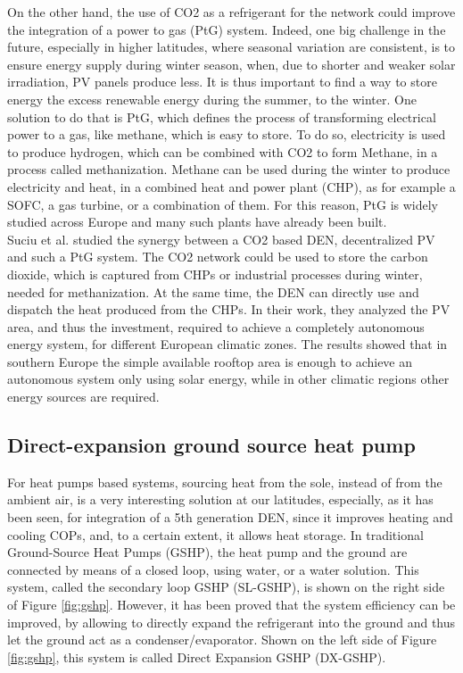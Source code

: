 \documentclass{article}
\begin{document}
On the other hand, the use of CO2 as a refrigerant for the network could improve the integration of a power to gas (PtG) system. Indeed, one big challenge in the future, especially in higher latitudes, where seasonal variation are consistent, is to ensure energy supply during winter season, when, due to shorter and weaker solar irradiation, PV panels produce less. It is thus important to find a way to store energy the excess renewable energy during the summer, to the winter.
One solution to do that is PtG, which defines the process of transforming electrical power to a gas, like methane, which is easy to store. To do so, electricity is used to produce hydrogen, which can be combined with CO2 to form Methane, in a process called methanization. Methane can be used during the winter to produce electricity and heat, in a combined heat and power plant (CHP), as for example a SOFC, a gas turbine, or a combination of them. For this reason, PtG is widely studied across Europe and many such plants have already been built.\\ 
Suciu et al. \cite{suciuEnergyIntegrationCO22018} studied the synergy between a CO2 based DEN, decentralized PV and such a PtG system. The CO2 network could be used to store the carbon dioxide, which is captured from CHPs or industrial processes during winter, needed for methanization. At the same time, the DEN can directly use and dispatch the heat produced from the CHPs. In their work, they analyzed the PV area, and thus the investment, required to achieve a completely autonomous energy system, for different European climatic zones. The results showed that in southern Europe the simple available rooftop area is enough to achieve an autonomous system only using solar energy, while in other climatic regions other energy sources are required.

\subsection{Direct-expansion ground source heat pump}\label{ss:dx}

For heat pumps based systems, sourcing heat from the sole, instead of from the ambient air, is a very interesting solution at our latitudes, especially, as it has been seen, for integration of a 5th generation DEN, since it improves heating and cooling COPs, and, to a certain extent, it allows heat storage. In traditional Ground-Source Heat Pumps (GSHP), the heat pump and the ground are connected by means of a closed loop, using water, or a water solution. This system, called the secondary loop GSHP (SL-GSHP), is shown on the right side of Figure \ref{fig:gshp}. However, it has been proved \cite{kruseStatusDevelopmentResearch, guoTechnoeconomicComparisonDirect2012} that the system efficiency can be improved, by allowing to directly expand the refrigerant into the ground and thus let the ground act as a condenser/evaporator. Shown on the left side of Figure \ref{fig:gshp}, this system is called Direct Expansion GSHP (DX-GSHP). 
\end{document}
